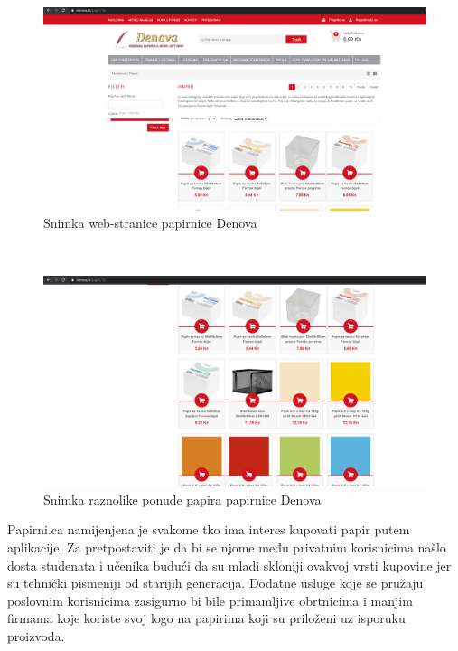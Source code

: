 		\begin{figure}[H]
			\includegraphics[scale=0.3]{slike/denova1.PNG} %
			
			\centering
			\caption{Snimka web-stranice papirnice Denova}
			\label{fig:denova1}%
		\end{figure}
		\noindent \normalsize{   } \\
		\begin{figure}[H]
			\includegraphics[scale=0.3]{slike/denova2.PNG} %
			
			\centering
			\caption{Snimka raznolike ponude papira papirnice Denova} 
			\label{fig:denova2}%
		\end{figure}
		
		\noindent \normalsize{Papirni.ca namijenjena je svakome tko ima interes kupovati papir putem aplikacije. Za pretpostaviti je da bi se njome među privatnim korisnicima našlo dosta studenata i učenika budući da su mladi skloniji ovakvoj vrsti kupovine jer su tehnički pismeniji od starijih generacija. Dodatne usluge koje se pružaju poslovnim korisnicima zasigurno bi bile primamljive obrtnicima i manjim firmama koje koriste svoj logo na papirima koji su priloženi uz isporuku proizvoda. } \\
		
